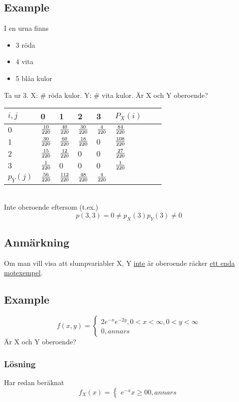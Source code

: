 \documentclass{article}
\begin{document}
\subsection{Example}
I en urna finns

\begin{itemize}
  \item 3 röda
  \item 4 vita
  \item 5 blåa kulor
\end{itemize}

Ta ur 3. X: \# röda kulor. Y: \# vita kulor. Är X och Y oberoende?\\
\begin{tabular}{ l | l l l l l l l }
  $i,j$       & 0 & 1 & 2 & 3 & $P_X(i)$ & \\\hline
  $0$         &$ \frac{10}{220} $&$ \frac{40}{220} $&$ \frac{30}{220} $&$ \frac{4}{220} $&$ \frac{84}{220} $& \\
  $1$         &$ \frac{30}{220} $&$ \frac{60}{220} $&$ \frac{18}{220} $&$ 0 $&$ \frac{108}{220} $& \\
  $2$         &$ \frac{15}{220} $&$ \frac{12}{220}  $&$ 0 $&$ 0 $&$ \frac{27}{220} $& \\
  $3$         &$ \frac{1}{220} $&$ 0 $&$ 0 $&$ 0 $&$ \frac{1}{220} $& \\
  $p_Y(j)$    &$ \frac{56}{220} $&$ \frac{112}{220} $&$ \frac{48}{220} $&$ \frac{4}{220} $&  & \\
\end{tabular}\\
Inte oberoende eftersom (t.ex.)
$$ p(3,3) = 0 \neq p_X(3)p_Y(3) \neq 0 $$

\subsection{Anmärkning}
Om man vill visa att slumpvariabler X, Y \underline{inte} är oberoende räcker \underline{ett enda motexempel}.

\subsection{Example}
$$
f(x,y)=
\begin{cases}
  2e^{-x}e^{-2y}, 0<x<\infty, 0<y<\infty\\
  0, annars
\end{cases}
$$
Är X och Y oberoende?

\subsubsection{Lösning}
Har redan beräknat
$$
f_X(x)=
\begin{cases}
  e^{-x} x\ge 0
  0, annars
\end{cases}
$$
\end{document}
